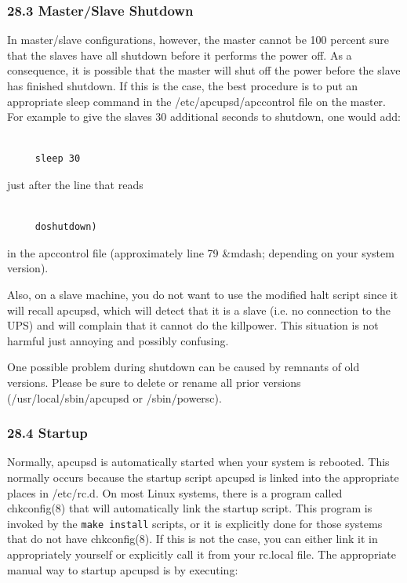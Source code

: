 \label{Master_002fSlave-Shutdown-_003c1_003e}

\subsubsection*{28.3 Master/Slave Shutdown}

In master/slave configurations, however, the master cannot be 100 percent sure
that the slaves have all shutdown before it performs the power off. As a
consequence, it is possible that the master will shut off the power before the
slave has finished shutdown. If this is the case, the best procedure is to put
an appropriate sleep command in the /etc/apcupsd/apccontrol file on the
master. For example to give the slaves 30 additional seconds to shutdown, one
would add: 

\footnotesize
\begin{verbatim}
     
     sleep 30
\end{verbatim}
\normalsize

just after the line that reads 

\footnotesize
\begin{verbatim}
     
     doshutdown)
\end{verbatim}
\normalsize

in the apccontrol file (approximately line 79 \&mdash; depending on your
system version).  

Also, on a slave machine, you do not want to use the modified halt script
since it will recall apcupsd, which will detect that it is a slave (i.e. no
connection to the UPS) and will complain that it cannot do the killpower. This
situation is not harmful just annoying and possibly confusing.  

One possible problem during shutdown can be caused by remnants of old
versions. Please be sure to delete or rename all prior versions
(/usr/local/sbin/apcupsd or /sbin/powersc). 

\label{Startup}

\subsubsection*{28.4 Startup}

\label{index-Startup-260}
Normally, apcupsd is automatically started when your system is rebooted. This
normally occurs because the startup script apcupsd is linked into the
appropriate places in /etc/rc.d. On most Linux systems, there is a program
called chkconfig(8) that will automatically link the startup script.  This
program is invoked by the {\tt make install} scripts, or it is explicitly done
for those systems that do not have chkconfig(8). If this is not the case, you
can either link it in appropriately yourself or explicitly call it from your
rc.local file. The appropriate manual way to startup apcupsd is by executing: 

